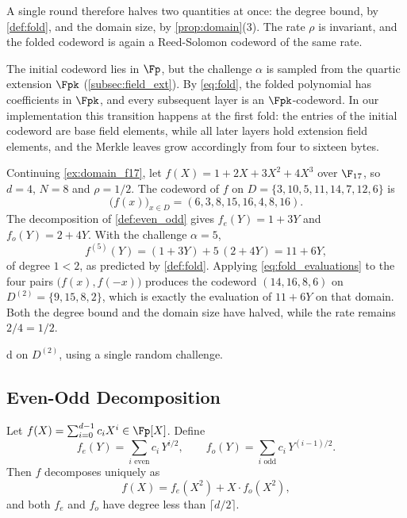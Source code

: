 A single round therefore halves two quantities at once: the degree
bound, by \cref{def:fold}, and the domain size, by
\cref{prop:domain}(3). The rate $\rho$ is invariant, and the folded
codeword is again a Reed-Solomon codeword of the same rate.
 
\begin{remark}
\label{rem:ext_field_fold}
The initial codeword lies in $\Fp$, but the challenge $\alpha$ is
sampled from the quartic extension $\Fpk$
(\cref{subsec:field_ext}). By \cref{eq:fold}, the folded polynomial has
coefficients in $\Fpk$, and every subsequent layer is an
$\Fpk$-codeword. In our implementation this transition happens at the
first fold: the entries of the initial codeword are base field
elements, while all later layers hold extension field elements, and the
Merkle leaves grow accordingly from four to sixteen bytes.
\end{remark}
 
\begin{example}
\label{ex:fold_f17}
Continuing \cref{ex:domain_f17}, let
$f(X) = 1 + 2X + 3X^2 + 4X^3$ over $\F_{17}$, so $d = 4$, $N = 8$ and
$\rho = 1/2$. The codeword of $f$ on $D = \{3, 10, 5, 11, 14, 7, 12,
6\}$ is
%
\[
\bigl(f(x)\bigr)_{x \in D} = (6, 3, 8, 15, 16, 4, 8, 16).
\]
%
The decomposition of \cref{def:even_odd} gives $f_e(Y) = 1 + 3Y$ and
$f_o(Y) = 2 + 4Y$. With the challenge $\alpha = 5$,
%
\[
f^{(5)}(Y) = (1 + 3Y) + 5\,(2 + 4Y) = 11 + 6Y ,
\]
%
of degree $1 < 2$, as predicted by \cref{def:fold}. Applying
\cref{eq:fold_evaluations} to the four pairs
$\bigl(f(x), f(-x)\bigr)$ produces the codeword
$(14, 16, 8, 6)$ on $D^{(2)} = \{9, 15, 8, 2\}$, which is exactly the
evaluation of $11 + 6Y$ on that domain. Both the degree bound and the
domain size have halved, while the rate remains $2/4 = 1/2$.
\end{example}
 d on $D^{(2)}$, using a single random challenge.
 
 
\subsection{Even-Odd Decomposition}
\label{subsec:even_odd}
 
\begin{definition}
\label{def:even_odd}
Let $f(X) = \sum_{i=0}^{d-1} c_i X^i \in \Fp[X]$. Define
%
\[
f_{e}(Y) = \sum_{i \text{ even}} c_i \, Y^{i/2},
\qquad
f_{o}(Y) = \sum_{i \text{ odd}} c_i \, Y^{(i-1)/2}.
\]
%
Then $f$ decomposes uniquely as
%
\begin{equation}
\label{eq:even_odd}
f(X) = f_{e}(X^2) + X \cdot f_{o}(X^2),
\end{equation}
%
and both $f_e$ and $f_o$ have degree less than $\lceil d/2 \rceil$.
\end{definition}
 
